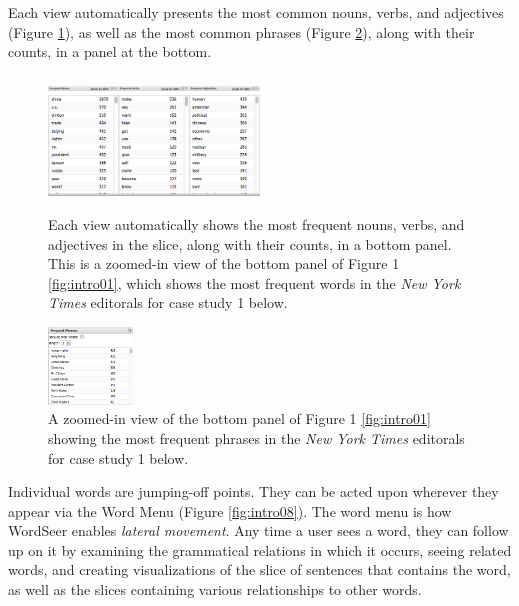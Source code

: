 \documentclass{sig-alternate}
\begin{document}
Each view automatically presents the most common nouns, verbs, and adjectives (Figure \ref{fig:intro06}), as well as the most common phrases (Figure \ref{fig:intro07}), along with their counts, in a panel at the bottom.    
\begin{figure}[ht!]
\begin{center}
	\includegraphics[width=0.5\textwidth]{fig/intro/06a.png}
	\includegraphics[width=0.5\textwidth]{fig/intro/06.png}
\end{center}
    \caption{%
        Each view automatically shows the most frequent nouns, verbs, and adjectives in the slice, along with their counts, in a bottom panel. This is a zoomed-in view of the bottom panel of Figure 1 \ref{fig:intro01}, which shows the most frequent words in the \emph{New York Times} editorals for case study 1 below.  \label{fig:intro06}
     }%
\end{figure}

\begin{figure}[ht!]
\begin{center}
	\includegraphics[width=0.2\textwidth]{fig/intro/07.png}
\end{center}
    \caption{%
        A zoomed-in view of the bottom panel of Figure 1 \ref{fig:intro01} showing the most frequent phrases in the \emph{New York Times} editorals for case study 1 below.  \label{fig:intro07}
     }%
\end{figure}

Individual words are jumping-off points. They can be acted upon wherever they appear via the Word Menu (Figure \ref{fig:intro08}). The word menu is how WordSeer enables \emph{lateral movement}.  Any time a user sees a word, they can follow up on it by examining the grammatical relations in which it occurs, seeing related words,  and creating visualizations of the slice of sentences that contains the word, as well as the slices containing various relationships to other words.
\end{document}
